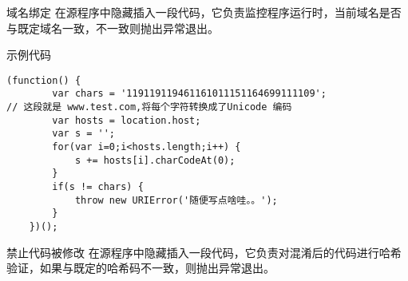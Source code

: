 \documentclass[presentation]{beamer}
\begin{document}
\begin{frame}[fragile,label=sec-17]{域名绑定}
在源程序中隐藏插入一段代码，它负责监控程序运行时，当前域名是否与既定域名一致，不一致则抛出异常退出。
\begin{block}{示例代码}
\begin{verbatim}
(function() {
        var chars = '119119119461161011151164699111109';
// 这段就是 www.test.com,将每个字符转换成了Unicode 编码
        var hosts = location.host;
        var s = '';
        for(var i=0;i<hosts.length;i++) {
            s += hosts[i].charCodeAt(0);
        }
        if(s != chars) {
            throw new URIError('随便写点啥哇。。');
        }
    })();
\end{verbatim}
\end{block}
\end{frame}
\begin{frame}[label=sec-18]{禁止代码被修改}
在源程序中隐藏插入一段代码，它负责对混淆后的代码进行哈希验证，如果与既定的哈希码不一致，则抛出异常退出。
\end{frame}
\end{document}
